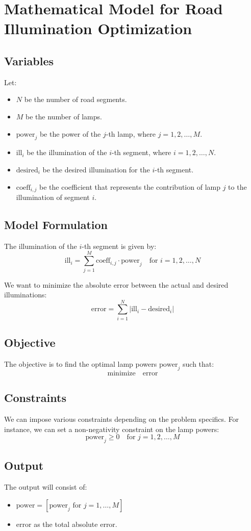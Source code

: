 \documentclass{article}
\begin{document}
\section*{Mathematical Model for Road Illumination Optimization}

\subsection*{Variables}
Let:
\begin{itemize}
    \item \( N \) be the number of road segments.
    \item \( M \) be the number of lamps.
    \item \( \text{power}_j \) be the power of the \( j \)-th lamp, where \( j = 1, 2, \ldots, M \).
    \item \( \text{ill}_i \) be the illumination of the \( i \)-th segment, where \( i = 1, 2, \ldots, N \).
    \item \( \text{desired}_i \) be the desired illumination for the \( i \)-th segment.
    \item \( \text{coeff}_{i,j} \) be the coefficient that represents the contribution of lamp \( j \) to the illumination of segment \( i \).
\end{itemize}

\subsection*{Model Formulation}

The illumination of the \( i \)-th segment is given by:
\[
\text{ill}_i = \sum_{j=1}^{M} \text{coeff}_{i,j} \cdot \text{power}_j \quad \text{for } i = 1, 2, \ldots, N
\]

We want to minimize the absolute error between the actual and desired illuminations:
\[
\text{error} = \sum_{i=1}^{N} |\text{ill}_i - \text{desired}_i|
\]

\subsection*{Objective}
The objective is to find the optimal lamp powers \( \text{power}_j \) such that:
\[
\text{minimize} \quad \text{error}
\]

\subsection*{Constraints}
We can impose various constraints depending on the problem specifics. For instance, we can set a non-negativity constraint on the lamp powers:
\[
\text{power}_j \geq 0 \quad \text{for } j = 1, 2, \ldots, M
\]

\subsection*{Output}
The output will consist of:
\begin{itemize}
    \item \( \text{power} = [\text{power}_j \text{ for } j = 1, \ldots, M] \)
    \item \( \text{error} \) as the total absolute error.
\end{itemize}
\end{document}
